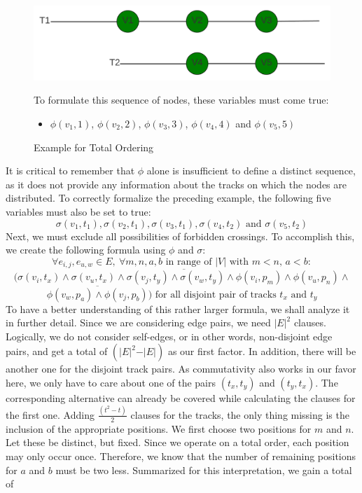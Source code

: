 \documentclass[bachelor, english]{algothesis}
\begin{document}
\begin{figure}[ht]
  \centering
  \begin{minipage}{0.6\textwidth}
    \includegraphics[width=\linewidth]{figures/Order_example.png} 
  \caption{Example for Total Ordering}
  \label{fig:order_example_tot}
  \end{minipage}%
  \begin{minipage}{0.4\textwidth}
    To formulate this sequence of nodes, these variables must come true:
    \begin{itemize}
    \item  $\phi(v_1,1)$, $\phi(v_2,2)$, $\phi(v_3,3)$, $\phi(v_4,4)$ and $\phi(v_5,5)$
    \end{itemize}
  \end{minipage}
\end{figure}
\noindent
It is critical to remember that $\phi$ alone is insufficient to define a distinct sequence, as it does not provide any information about the tracks on which the nodes are distributed. To correctly formalize the preceding example, the following five variables must also be set to true: 
$$\sigma(v_1, t_1), \sigma(v_2, t_1), \sigma(v_3, t_1), \sigma(v_4, t_2) \text{ and } \sigma(v_5, t_2)$$
\noindent
Next, we must exclude all possibilities of forbidden crossings. To accomplish this, we create the following formula using $\phi$ and $\sigma$:
    $$ \forall e_{i,j}, e_{u,w} \in E, \ \forall m,n,a,b \text{ in range of } \vert V \vert \text{ with } m<n, \, a<b:$$
    $$(\overline{\sigma(v_i,t_x) \land \sigma(v_u,t_x) \land \sigma(v_j,t_y) \land \sigma(v_w,t_y) \land \phi(v_i,p_m) \land \phi(v_u,p_n) \land}$$
    $$ \overline{\phi(v_w,p_a) \land \phi(v_j,p_b)})\text{ for all disjoint pair of tracks } t_x \text{ and } t_y $$
To have a better understanding of this rather larger formula, we shall analyze it in further detail. Since we are considering edge pairs, we need $\vert E \vert^2$ clauses. Logically, we do not consider self-edges, or in other words, non-disjoint edge pairs, and get a total of $(\vert E \vert^2 - \vert E \vert)$ as our first factor. In addition, there will be another one for the disjoint track pairs. As commutativity also works in our favor here, we only have to care about one of the pairs $(t_x, t_y)$ and $(t_y, t_x)$. The corresponding alternative can already be covered while calculating the clauses for the first one. Adding $\frac{(t^2-t)}{2}$ clauses for the tracks, the only thing missing is the inclusion of the appropriate positions. We first choose two positions for $m$ and $n$. Let these be distinct, but fixed. Since we operate on a total order, each position may only occur once. Therefore, we know that the number of remaining positions for $a$ and $b$ must be two less. Summarized for this interpretation, we gain a total of 
\end{document}
